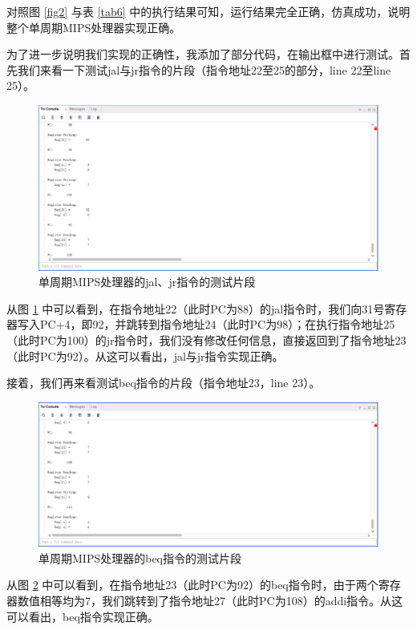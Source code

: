 \documentclass{cumcm}
\numberwithin{equation}{section}
\numberwithin{equation}{subsection}
\begin{document}
对照图 \ref{fig2} 与表 \ref{tab6} 中的执行结果可知，运行结果完全正确，仿真成功，说明整个单周期MIPS处理器实现正确。

为了进一步说明我们实现的正确性，我添加了部分代码，在输出框中进行测试。首先我们来看一下测试jal与jr指令的片段（指令地址22至25的部分，line 22至line 25）。

\begin{figure}[htbp]
    \centering
    \includegraphics[width=6in]{2-jal-jr.png}
    \caption{单周期MIPS处理器的jal、jr指令的测试片段}
    \label{fig3}
\end{figure}

从图 \ref{fig3} 中可以看到，在指令地址22（此时PC为88）的jal指令时，我们向31号寄存器写入PC+4，即92，并跳转到指令地址24（此时PC为98）；在执行指令地址25（此时PC为100）的jr指令时，我们没有修改任何信息，直接返回到了指令地址23（此时PC为92）。从这可以看出，jal与jr指令实现正确。

\clearpage 
接着，我们再来看测试beq指令的片段（指令地址23，line 23）。

\begin{figure}[htbp]
    \centering
    \includegraphics[width=6in]{3-beq.png}
    \caption{单周期MIPS处理器的beq指令的测试片段}
    \label{fig4}
\end{figure}

从图 \ref{fig4} 中可以看到，在指令地址23（此时PC为92）的beq指令时，由于两个寄存器数值相等均为7，我们跳转到了指令地址27（此时PC为108）的addi指令。从这可以看出，beq指令实现正确。
\end{document}
